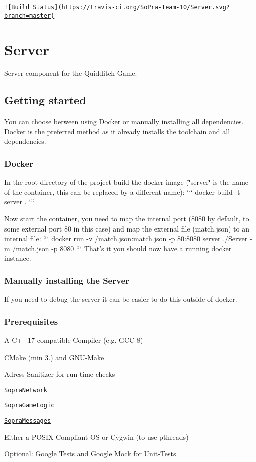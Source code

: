 \href{https://travis-ci.org/SoPra-Team-10/Server}{\tt !\mbox{[}Build Status\mbox{]}(https\-://travis-\/ci.\-org/\-So\-Pra-\/\-Team-\/10/\-Server.\-svg?branch=master)} \section*{Server}

Server component for the Quidditch Game.

\subsection*{Getting started}

You can choose between using Docker or manually installing all dependencies. Docker is the preferred method as it already installs the toolchain and all dependencies.

\subsubsection*{Docker}

In the root directory of the project build the docker image (\char`\"{}server\char`\"{} is the name of the container, this can be replaced by a different name)\-: ``` docker build -\/t server . ```

Now start the container, you need to map the internal port (8080 by default, to some external port 80 in this case) and map the external file (match.\-json) to an internal file\-: ``` docker run -\/v /match.json\-:match.\-json -\/p 80\-:8080 server ./\-Server -\/m /match.json -\/p 8080 ``` That's it you should now have a running docker instance.

\subsubsection*{Manually installing the Server}

If you need to debug the server it can be easier to do this outside of docker.

\subsubsection*{Prerequisites}


\begin{DoxyItemize}
\item A C++17 compatible Compiler (e.\-g. G\-C\-C-\/8)
\item C\-Make (min 3.) and G\-N\-U-\/\-Make
\item Adress-\/\-Sanitizer for run time checks
\item \href{https://github.com/SoPra-Team-10/Network}{\tt Sopra\-Network}
\item \href{https://github.com/SoPra-Team-10/GameLogic}{\tt Sopra\-Game\-Logic}
\item \href{https://github.com/SoPra-Team-10/Messages}{\tt Sopra\-Messages}
\item Either a P\-O\-S\-I\-X-\/\-Compliant O\-S or Cygwin (to use pthreads)
\item Optional\-: Google Tests and Google Mock for Unit-\/\-Tests
\end{DoxyItemize}

